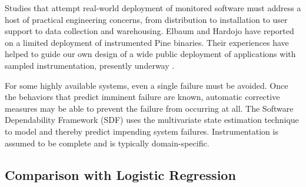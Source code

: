 \documentclass[draft]{sig-alternate}
\newcommand{\issue}[2][]{}
\begin{document}
Studies that attempt real-world deployment of monitored software must
address a host of practical engineering concerns, from distribution to
installation to user support to data collection and warehousing.
Elbaum and Hardojo \cite{Elbaum:2003:DISATA} have reported on a
limited deployment of instrumented Pine binaries.  Their experiences
have helped to guide our own design of a wide public deployment of
applications with sampled instrumentation, presently underway
\cite{Liblit:2003:CBIP}.

For some highly available systems, even a single failure must be
avoided.  Once the behaviors that predict imminent failure are known,
automatic corrective measures may be able to prevent the failure from
occurring at all.  The Software Dependability Framework (SDF)
\cite{Gross:2003:PSMUST} uses the multivariate state estimation
technique to model and thereby predict impending system failures.
Instrumentation is assumed to be complete and is typically
domain-specific.

\issue[Alex]{There is a new Ernst paper in FSE and there was another
  one in ICSE.  I'm not sure either is really relevant, but if we are
  going to cite him we should show awareness of the more recent work.}

\issue[Alex]{I don't know what Orso has been doing other than that he
  told me they have done a study on whether code coverage in the field
  is similar to code coverage in testing; we should cite that one.
  It's on his home page, I'm pretty sure (Alessandro Orso, I think, at
  Georgia Tech).}

\issue[Mayur]{Add references to Ernst and Orso.  [I think we already
  have enough references to these folks and the related work section
  is already quite long.  Let us give this the least priority.]}

\subsection{Comparison with Logistic Regression}
\label{sec:comparison}
\end{document}
